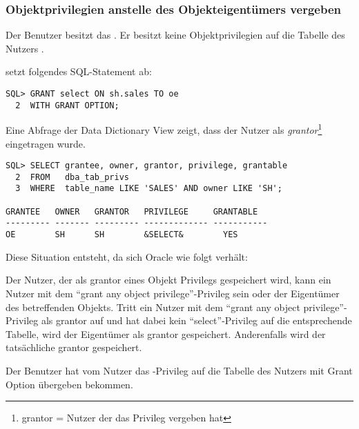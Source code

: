         \subsubsection{Objektprivilegien anstelle des Objekteigentümers vergeben}
        \label{grantingobjectspriveonbehalfofowner}
          Der Benutzer  besitzt das . Er besitzt keine Objektprivilegien auf die Tabelle  des Nutzers .

           setzt folgendes SQL-Statement ab:
          \begin{lstlisting}[caption={\identifier{hr} erteilt \identifier{oe} das SELECT-Privileg auf \identifier{sh.sales}},label=admin238,language=oracle_sql]
SQL> GRANT select ON sh.sales TO oe
  2  WITH GRANT OPTION;
          \end{lstlisting}
          Eine Abfrage der Data Dictionary View  zeigt, dass der Nutzer  als \textit{grantor}\footnote{grantor = Nutzer der das Privileg vergeben hat} eingetragen wurde.
          \begin{lstlisting}[caption={Abfrage der View \identifier{dba\_tab\_privs} - 1},language=oracle_sql,label=admin239,language=oracle_sql]
SQL> SELECT grantee, owner, grantor, privilege, grantable
  2  FROM   dba_tab_privs
  3  WHERE  table_name LIKE 'SALES' AND owner LIKE 'SH';

GRANTEE   OWNER   GRANTOR   PRIVILEGE     GRANTABLE
--------- ------- --------- ------------- -----------
OE        SH      SH        &SELECT&        YES
          \end{lstlisting}
          Diese Situation entsteht, da sich Oracle wie folgt verhält:

          Der Nutzer, der als grantor eines Objekt Privilegs gespeichert wird, kann ein Nutzer mit dem \enquote{grant any object privilege}-Privileg sein oder der Eigentümer des betreffenden Objekts. Tritt ein Nutzer mit dem \enquote{grant any object privilege}-Privileg als grantor auf und hat dabei kein \enquote{select}-Privileg auf die entsprechende Tabelle, wird der Eigentümer als grantor gespeichert. Anderenfalls wird der tatsächliche grantor gespeichert.

          Der Benutzer  hat vom Nutzer  das -Privileg auf die Tabelle  des Nutzers  mit Grant Option übergeben bekommen.

